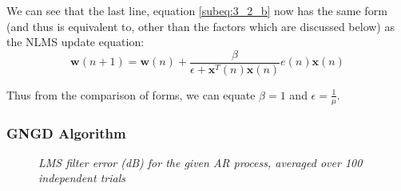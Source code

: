\documentclass[./main.tex]{subfiles}
\begin{document}
We can see that the last line, equation \ref{subeq:3_2_b} now has the same form (and thus is equivalent to, other than the factors which are discussed below) as the NLMS update equation:
$$ \mathbf{w}(n+1) = \mathbf{w}(n) + \frac{\beta}{\epsilon + \mathbf{x}^T(n)\mathbf{x}(n)} e(n) \mathbf{x}(n) $$

Thus from the comparison of forms, we can equate $ \beta = 1 $ and $ \epsilon = \frac{1}{\mu} $.

\subsubsection{GNGD Algorithm}

\begin{figure}[h]
	\centering 
	\resizebox{\textwidth}{!}{}
	\caption{\textit{LMS filter error (dB) for the given AR process, averaged over 100 independent trials}}
	\label{fig:3_2_c}
\end{figure}
\end{document}
